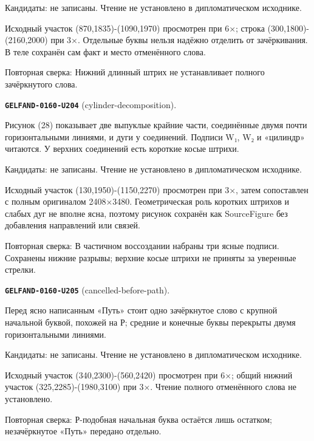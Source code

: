 Кандидаты: не записаны. Чтение не установлено в дипломатическом исходнике.\par
Исходный участок (870,1835)-(1090,1970) просмотрен при 6×; строка (300,1800)-(2160,2000) при 3×. Отдельные буквы нельзя надёжно отделить от зачёркивания. В теле сохранён сам факт и место отменённого слова.\par
Повторная сверка: Нижний длинный штрих не устанавливает полного зачёркнутого слова.\par\medskip
\par\noindent\leavevmode{}\label{GELFAND-0160-U204}\label{GELFAND-P001477:cylinder-decomposition}\textbf{\texttt{GELFAND-0160-U204}} (cylinder-decomposition).\nopagebreak[4]\par
Рисунок (28) показывает две выпуклые крайние части, соединённые двумя почти горизонтальными линиями, и дуги у соединений. Подписи W₁, W₂ и «цилиндр» читаются. У верхних соединений есть короткие косые штрихи.\par
Кандидаты: не записаны. Чтение не установлено в дипломатическом исходнике.\par
Исходный участок (130,1950)-(1150,2270) просмотрен при 3×, затем сопоставлен с полным оригиналом 2408×3480. Геометрическая роль коротких штрихов и слабых дуг не вполне ясна, поэтому рисунок сохранён как SourceFigure без добавления направлений или связей.\par
Повторная сверка: В частичном воссоздании набраны три ясные подписи. Сохранены нижние разрывы; верхние косые штрихи не приняты за уверенные стрелки.\par\medskip
\par\noindent\leavevmode{}\label{GELFAND-0160-U205}\label{GELFAND-P001477:cancelled-before-path}\textbf{\texttt{GELFAND-0160-U205}} (cancelled-before-path).\nopagebreak[4]\par
Перед ясно написанным «Путь» стоит одно зачёркнутое слово с крупной начальной буквой, похожей на Р; средние и конечные буквы перекрыты двумя горизонтальными линиями.\par
Кандидаты: не записаны. Чтение не установлено в дипломатическом исходнике.\par
Исходный участок (340,2300)-(560,2420) просмотрен при 6×; общий нижний участок (325,2285)-(1980,3100) при 3×. Чтение полного отменённого слова не установлено.\par
Повторная сверка: Р-подобная начальная буква остаётся лишь остатком; незачёркнутое «Путь» передано отдельно.\par\medskip
